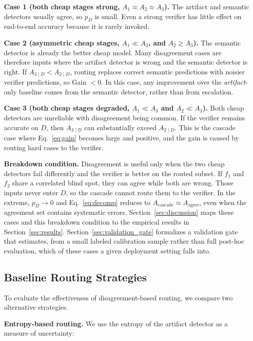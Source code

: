 \documentclass{ieeeaccess}
\begin{document}
\textbf{Case 1 (both cheap stages strong, $A_1 \approx A_2 \approx A_3$).}
The artifact and semantic detectors usually agree, so $p_D$ is small. Even
a strong verifier has little effect on end-to-end accuracy because it is
rarely invoked.

\textbf{Case 2 (asymmetric cheap stages, $A_1 \ll A_2$, and $A_2 \gtrsim A_3$).}
The semantic detector is already the better cheap model. Many disagreement
cases are therefore inputs where the artifact detector is wrong and the
semantic detector is right. If $A_{3\mid D} < A_{2\mid D}$, routing replaces
correct semantic predictions with noisier verifier predictions, so
Gain $<0$. In this case, any improvement over the \emph{artifact}-only
baseline comes from the semantic detector, rather than from escalation.

\textbf{Case 3 (both cheap stages degraded, $A_1 \ll A_3$ and $A_2 \ll A_3$).}
Both cheap detectors are unreliable with disagreement being common. If the
verifier remains accurate on $D$, then $A_{3\mid D}$ can substantially
exceed $A_{2\mid D}$. This is the cascade case where Eq.~\eqref{eq:gain} becomes
large and positive, and the gain is caused by routing hard cases to the
verifier.

\textbf{Breakdown condition.} Disagreement is useful only when the two cheap
detectors fail differently and the verifier is better on the routed subset.
If $f_1$ and $f_2$ share a correlated blind spot, they can agree while both
are wrong. Those inputs never enter $D$, so the cascade cannot route them to
the verifier. In the extreme, $p_D \to 0$ and
Eq.~\eqref{eq:decomp} reduces to
$A_{\text{cascade}} \approx A_{\text{agree}}$, even when the agreement set
contains systematic errors. Section~\ref{sec:discussion} maps these cases and this breakdown
condition to the empirical results in Section~\ref{sec:results}.
Section~\ref{sec:validation_gate} formalizes a validation gate that estimates, from a small
labeled calibration sample rather than full post-hoc evaluation, which of
these cases a given deployment setting falls into.

\subsection{Baseline Routing Strategies}

To evaluate the effectiveness of disagreement-based routing, we compare two alternative strategies.

\textbf{Entropy-based routing.}  
We use the entropy of the artifact detector as a measure of uncertainty:
\end{document}
